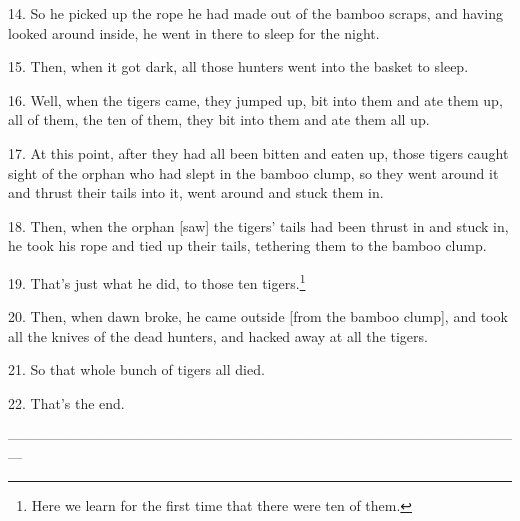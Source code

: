 14. So he picked up the rope he had made out of the bamboo scraps, and having looked
around inside, he went in there to sleep for the night.

15. Then, when it got dark, all those hunters went into the basket to sleep.

16. Well, when the tigers came, they jumped up, bit into them and ate them up,
all of them, the ten of them, they bit into them and ate them all up.

17. At this point, after they had all been bitten and eaten up, those tigers caught
sight of the orphan who had slept in the bamboo clump, so they went around it and
thrust their tails into it, went around and stuck them in.

18. Then, when the orphan [saw] the tigers' tails had been thrust in and stuck
in, he took his rope and tied up their tails, tethering them to the bamboo clump.

19. That's just what he did, to those ten tigers.\footnote{Here we learn for the first time that there were ten of them.}

20. Then, when dawn broke, he came outside [from the bamboo clump], and took all
the knives of the dead hunters, and hacked away at all the tigers.

21. So that whole bunch of tigers all died.

22. That's the end.

---------------------------------------------------------------------------------------------------------------

